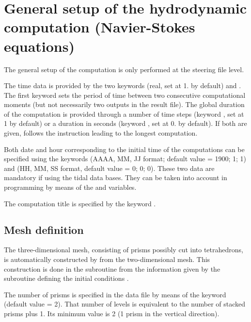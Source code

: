 \chapter{General setup of the hydrodynamic computation (Navier-Stokes equations)}

The general setup of the computation is only performed at the steering file
level.

The time data is provided by the two keywords  (real, set at
1. by default) and . The first keyword sets the
period of time between two consecutive computational moments (but not
necessarily two outputs in the result file). The global duration of the
computation is provided through a number of time steps (keyword , set at 1 by default) or a duration in seconds (keyword
, set at 0. by default). If both are given,  follows
the instruction leading to the longest computation.

Both date and hour corresponding to the initial time of the computations can be
specified using the keywords 
(AAAA, MM, JJ format; default value = 1900; 1; 1) and  (HH, MM, SS format, default value = 0; 0; 0).
These two data are mandatory if using the tidal data bases.
They can be taken into account in programming by means of the 
and  variables.

The computation title is specified by the keyword .


\section{Mesh definition}

The three-dimensional mesh, consisting of prisms possibly cut into
tetrahedrons, is automatically constructed by  from the
two-dimensional mesh. This construction is done in the subroutine
 from the information given by the subroutine defining the
initial conditions .

The number of prisms is specified in the data file by means of the keyword
 (default value = 2). That number of levels
is equivalent to the number of stacked prisms plus 1. Its minimum value is 2 (1
prism in the vertical direction).

